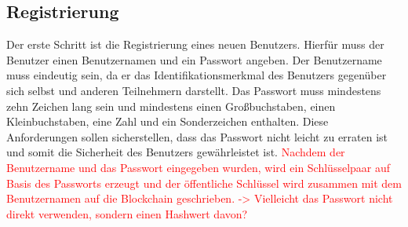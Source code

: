 \subsection{Registrierung}



Der erste Schritt ist die Registrierung eines neuen Benutzers. Hierfür muss der Benutzer einen Benutzernamen
und ein Passwort angeben. Der Benutzername muss eindeutig sein, da er das Identifikationsmerkmal 
des Benutzers gegenüber sich selbst und anderen Teilnehmern darstellt.
Das Passwort muss mindestens zehn Zeichen lang sein und mindestens einen Großbuchstaben, einen Kleinbuchstaben,
eine Zahl und ein Sonderzeichen enthalten. Diese Anforderungen sollen sicherstellen, dass das Passwort
nicht leicht zu erraten ist und somit die Sicherheit des Benutzers gewährleistet ist.
\textcolor{red}{Nachdem der Benutzername und das Passwort eingegeben wurden, wird ein Schlüsselpaar auf 
Basis des Passworts erzeugt und der öffentliche Schlüssel wird zusammen mit dem
Benutzernamen auf die Blockchain geschrieben. -> Vielleicht das Passwort nicht direkt verwenden, sondern
einen Hashwert davon?}


